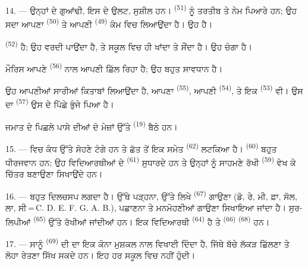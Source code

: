 14. --- ਉਨ੍ਹਾਂ ਦੇ ਗੁਆਂਢੀ, ਇਸ ਦੇ ਉਲਟ, ਸੁਸ਼ੀਲ ਹਨ। 
\textsuperscript{(51)} ਨੂੰ ਤਰਤੀਬ ਤੇ ਨੇਮ ਪਿਆਰੇ ਹਨ; ਉਹ ਸਦਾ ਆਪਣਾ 
\textsuperscript{(50)} ਤੇ ਆਪਣੀ  \textsuperscript{(49)} ਕੰਮ ਵਿਚ
ਲਿਆਉਂਦਾ ਹੈ। ਉਹ  ਹੈ।

 \textsuperscript{(52)}  ਹੈ; ਉਹ ਵਰਦੀ ਪਾਉਂਦਾ
ਹੈ, ਤੇ ਸਕੂਲ ਵਿਚ ਹੀ ਖਾਂਦਾ ਤੇ ਸੌਂਦਾ ਹੈ। ਉਹ ਚੰਗਾ  ਹੈ।

ਮੌਰਿਸ ਆਪਣੇ  \textsuperscript{(56)} ਨਾਲ ਆਪਣੀ  ਛਿੱਲ
ਰਿਹਾ ਹੈ; ਉਹ ਬਹੁਤ ਸਾਵਧਾਨ ਹੈ।

ਉਹ ਆਪਣੀਆਂ ਸਾਰੀਆਂ ਕਿਤਾਬਾਂ ਲਿਆਉਂਦਾ ਹੈ, ਆਪਣਾ 
\textsuperscript{(55)}, ਆਪਣੀ  \textsuperscript{(54)}, ਤੇ ਇਕ
 \textsuperscript{(53)} ਵੀ। ਉਸ ਦਾ 
\textsuperscript{(57)} ਉਸ ਦੇ ਪਿੱਛੇ ਭੁੰਜੇ ਪਿਆ ਹੈ।

ਜਮਾਤ ਦੇ ਪਿਛਲੇ ਪਾਸੇ ਦੀਆਂ ਦੋ ਮੇਜ਼ਾਂ ਉੱਤੇ 
\textsuperscript{(19)} ਬੈਠੇ ਹਨ।

\VUsaut{4.6mm}
\VUsaut{3.4mm}

15. ---  ਵਿਚ ਕੰਧ ਉੱਤੇ ਸੋਹਣੇ  ਟੰਗੇ ਹਨ ਤੇ
ਛੱਤ ਤੋਂ ਇਕ  ਸਮੇਤ  \textsuperscript{(62)} ਲਟਕਿਆ
ਹੈ।  \textsuperscript{(60)} ਬਹੁਤ ਧੀਰਜਵਾਨ ਹਨ; ਉਹ ਵਿਦਿਆਰਥੀਆਂ ਦੇ
 \textsuperscript{(61)} ਸੁਧਾਰਦੇ ਹਨ ਤੇ ਉਨ੍ਹਾਂ ਨੂੰ ਸਾਹਮਣੇ ਰੱਖੀ
 \textsuperscript{(59)} ਵੇਖ ਕੇ ਚਿੱਤਰ ਬਣਾਉਣਾ ਸਿਖਾਉਂਦੇ ਹਨ।

16. ---  ਬਹੁਤ ਦਿਲਚਸਪ ਲਗਦਾ ਹੈ। ਉੱਥੇ  ਪੜ੍ਹਨਾ,
 ਉੱਤੇ ਲਿਖੇ  \textsuperscript{(67)} ਗਾਉਣਾ (ਡੋ, ਰੇ,
ਮੀ, ਫ਼ਾ, ਸੋਲ, ਲਾ, ਸੀ\,=\,C. D. E. F. G. A. B.),  ਪਛਾਣਨਾ ਤੇ
ਮਨਮੋਹਣੀਆਂ  ਗਾਉਣਾ ਸਿਖਾਇਆ ਜਾਂਦਾ ਹੈ। ਸੁਰ-ਲਿਪੀਆਂ 
\textsuperscript{(65)} ਉੱਤੇ ਰੱਖੀਆਂ ਜਾਂਦੀਆਂ ਹਨ। ਇਕ ਵਿਦਿਆਰਥੀ
 \textsuperscript{(64)} ਹੈ ਤੇ 
\textsuperscript{(66)}  \textsuperscript{(68)} ਹਨ।

17. --- ਸਾਨੂੰ  \textsuperscript{(69)} ਦੀ  ਦਾ
ਇਕ ਕੋਨਾ ਮੁਸ਼ਕਲ ਨਾਲ ਵਿਖਾਈ ਦਿੰਦਾ ਹੈ, ਜਿੱਥੇ ਬੱਚੇ ਲੱਕੜ ਛਿੱਲਣਾ ਤੇ ਲੋਹਾ ਰੇਤਣਾ ਸਿੱਖ
ਸਕਦੇ ਹਨ। ਇਹ ਹਰ ਸਕੂਲ ਵਿਚ ਨਹੀਂ ਹੁੰਦੀ।

\VUsaut{5.0mm}
\VUsaut{3.6mm}

